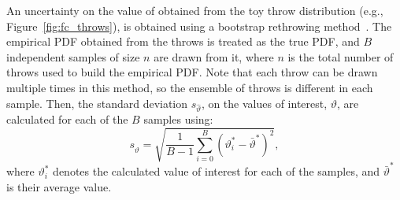 An uncertainty on the value of \dchisqcrit obtained from the toy throw distribution (e.g., Figure~\ref{fig:fc_throws}), is obtained using a bootstrap rethrowing method~\cite{rice2006mathematical}. The empirical PDF obtained from the throws is treated as the true PDF, and $B$ independent samples of size $n$ are drawn from it, where $n$ is the total number of throws used to build the empirical PDF. Note that each throw can be drawn multiple times in this method, so the ensemble of throws is different in each sample. Then, the standard deviation $s_{\hat{\vartheta}}$, on the \dchisqcrit values of interest, $\vartheta$, are calculated for each of the $B$ samples using:
\begin{equation}
  s_{\hat{\vartheta}} = \sqrt{\frac{1}{B-1} \sum^{B}_{i=0} (\vartheta_{i}^{*} - \bar{\vartheta}^{*})^{2}},
  \label{eq:fc_uncertainty}
\end{equation}
where $\vartheta_{i}^{*}$ denotes the calculated \dchisqcrit value of interest for each of the samples, and $\bar{\vartheta}^{*}$ is their average value.

